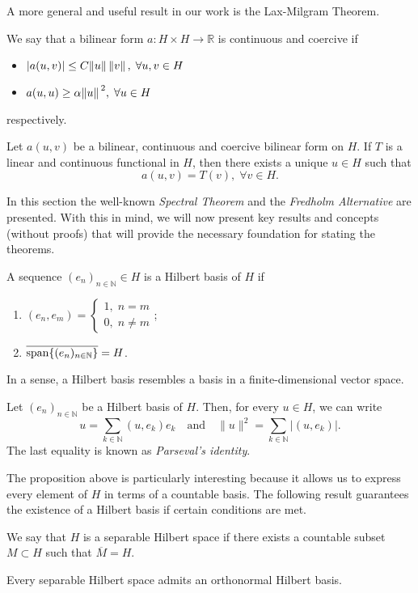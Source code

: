 A more general and useful result in our work is the Lax-Milgram Theorem.
\begin{definition}
    We say that a bilinear form \(a: H \times H \rightarrow \mathbb{R}\) is continuous and coercive if
    \begin{itemize}
        \item \(\abs{a(u,v)} \leq C \norm*{u}\norm*{v}, \; \forall u, v \in H\)
        \item \(a(u,u) \geq \alpha \norm*{u}^2, \; \forall u \in H\)
    \end{itemize}
    respectively.
\end{definition}
\begin{theorem}\label{lax-milgram}
    Let \(a(u,v)\) be a bilinear, continuous and coercive bilinear form on \(H\). If \(T\) is a linear and continuous functional in \(H\), then there exists a unique \(u \in H\) such that
    \[
        a(u, v) = T(v), \; \forall v \in H.
    \]
\end{theorem}
In this section the well-known \textit{Spectral Theorem} and the \textit{Fredholm Alternative} are presented. With this in mind, we will now present key results and concepts (without proofs) that will provide the necessary foundation for stating the theorems.
\begin{definition}
    A sequence \((e_n)_{n \in \mathbb{N}} \in H\) is a Hilbert basis of \(H\) if
    \begin{enumerate}
        \item \((e_n, e_m) = \begin{cases}
            1, \; n=m\\
            0, \; n \neq m
        \end{cases}\);
        \item \(\overline{\operatorname{span}\{(e_n)_{n \in \mathbb{N}}\}} = H\).
    \end{enumerate}
\end{definition}
In a sense, a Hilbert basis resembles a basis in a finite-dimensional vector space.
\begin{proposition}\label{hilb_basis}
    Let $(e_n)_{n \in \mathbb{N}}$ be a Hilbert basis of $H$. Then, for every $u \in H$, we can write
    \[
        u = \sum_{k \in \mathbb{N}} (u, e_k)e_k \quad \text{and} \quad \|u\|^2 = \sum_{k \in \mathbb{N}} |(u, e_k)|.
    \]
    The last equality is known as \textit{Parseval's identity}.
\end{proposition}
The proposition above is particularly interesting because it allows us to express every element of \(H\) in terms of a countable basis. The following result guarantees the existence of a Hilbert basis if certain conditions are met.
\begin{definition}
    We say that \(H\) is a separable Hilbert space if there exists a countable subset \(M \subset H\) such that \(\overline{M} = H\).
\end{definition}
\begin{theorem}
    Every separable Hilbert space admits an orthonormal Hilbert basis.
\end{theorem}

